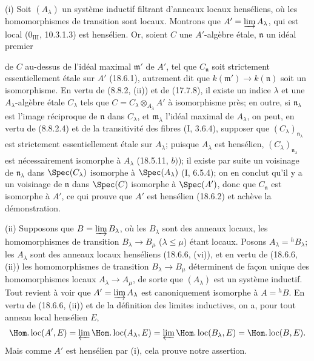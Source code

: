 (i) Soit $(A_\lambda)$ un système inductif filtrant d'anneaux locaux henséliens, où les homomorphismes de transition sont locaux. Montrons que $A'=\varinjlim A_\lambda$, qui est local ($0_{\mathrm{III}}$, 10.3.1.3) est hensélien. Or, soient $C$ une $A'$-algèbre étale, $\mathfrak n$ un idéal premier


de $C$ au-dessus de l'idéal maximal $\mathfrak m'$ de $A'$, tel que $C_{\mathfrak n}$ soit strictement essentiellement étale sur $A'$ (18.6.1), autrement dit que $k(\mathfrak m')\to k(\mathfrak n)$ soit un isomorphisme. En vertu de (8.8.2, (ii)) et de (17.7.8), il existe un indice $\lambda$ et une $A_\lambda$-algèbre étale $C_\lambda$ tels que $C=C_\lambda\otimes_{A_\lambda}A'$ à isomorphisme près; en outre, si $\mathfrak n_\lambda$ est l'image réciproque de $\mathfrak n$ dans $C_\lambda$, et $\mathfrak m_\lambda$ l'idéal maximal de $A_\lambda$, on peut, en vertu de (8.8.2.4) et de la transitivité des fibres (I, 3.6.4), supposer que $(C_\lambda)_{\mathfrak n_\lambda}$ est strictement essentiellement étale sur $A_\lambda$; puisque $A_\lambda$ est hensélien, $(C_\lambda)_{\mathfrak n_\lambda}$ est nécessairement isomorphe à $A_\lambda$ (18.5.11, $b)$); il existe par suite un voisinage de $\mathfrak n_\lambda$ dans $\Spec(C_\lambda)$ isomorphe à $\Spec(A_\lambda)$ (I, 6.5.4); on en conclut qu'il y a un voisinage de $\mathfrak n$ dans $\Spec(C)$ isomorphe à $\Spec(A')$, donc que $C_{\mathfrak n}$ est isomorphe à $A'$, ce qui prouve que $A'$ est hensélien (18.6.2) et achève la démonstration.

(ii) Supposons que $B=\varinjlim B_\lambda$, où les $B_\lambda$ sont des anneaux locaux, les homomorphismes de transition $B_\lambda\to B_\mu$ ($\lambda\leq\mu$) étant locaux. Posons $A_\lambda={}^h\!B_\lambda$; les $A_\lambda$ sont des anneaux locaux henséliens (18.6.6, (vi)), et en vertu de (18.6.6, (ii)) les homomorphismes de transition $B_\lambda\to B_\mu$ déterminent de façon unique des homomorphismes locaux $A_\lambda\to A_\mu$, de sorte que $(A_\lambda)$ est un système inductif. Tout revient à voir que $A'=\varinjlim A_\lambda$ est canoniquement isomorphe à $A={}^h\!B$. En vertu de (18.6.6, (ii)) et de la définition des limites inductives, on a, pour tout anneau local hensélien $E$,
\[
  \Hom.\operatorname{loc}(A',E)
  =\varprojlim\Hom.\operatorname{loc}(A_\lambda,E)
  =\varprojlim\Hom.\operatorname{loc}(B_\lambda,E)
  =\Hom.\operatorname{loc}(B,E).
\]
Mais comme $A'$ est hensélien par (i), cela prouve notre assertion.

